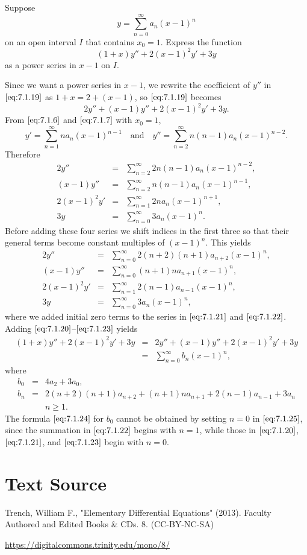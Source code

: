 \documentclass{ximera}
\begin{document}
\begin{example}\label{example:7.1.7}
Suppose
$$
y=\sum_{n=0}^\infty a_n (x-1)^n
$$
 on an open interval $I$ that contains $x_0=1$.
Express the function
\begin{equation} \label{eq:7.1.19}
(1+x)y''+2(x-1)^2y'+3y
\end{equation}
as a power series in $x-1$ on $I$.

\begin{explanation}  Since we want a  power series in $x-1$,
we rewrite the coefficient of $y''$ in $\eqref{eq:7.1.19}$ as
$1+x=2+(x-1)$, so   $\eqref{eq:7.1.19}$ becomes
$$
2y''+(x-1)y''+2(x-1)^2y'+3y.
$$
From $\eqref{eq:7.1.6}$ and $\eqref{eq:7.1.7}$ with $x_0=1$,
$$
y'=\sum_{n=1}^\infty na_n(x-1)^{n-1}\quad\mbox{and}\quad
y ''=\sum_{n=2}^\infty n(n-1)a_n(x-1)^{n-2}.
$$
Therefore
\begin{eqnarray*}
2y ''&=&\sum_{n=2}^\infty 2n(n-1)a_n(x-1)^{n-2},\\
(x-1)y ''&=&\sum_{n=2}^\infty n(n-1)a_n(x-1)^{n-1},\\
2(x-1)^2y'&=&\sum_{n=1}^\infty2na_n(x-1)^{n+1},\\
3y&=&\sum_{n=0}^\infty 3a_n (x-1)^n.
\end{eqnarray*}
Before adding these four series we shift indices in the first three so
that their general terms become constant multiples of $(x-1)^n$. This
yields
\begin{eqnarray}
2y ''&=&\sum_{n=0}^\infty 2(n+2)(n+1)a_{n+2}(x-1)^n,\label{eq:7.1.20}\\
(x-1)y''&=&\sum_{n=0}^\infty (n+1)na_{n+1}(x-1)^n,
\label{eq:7.1.21}\\
2(x-1)^2y'&=&\sum_{n=1}^\infty 2(n-1)a_{n-1}(x-1)^n,\label{eq:7.1.22}\\
3y&=&\sum_{n=0}^\infty 3a_n (x-1)^n, \label{eq:7.1.23}
\end{eqnarray}
where we added initial zero terms to the series in $\eqref{eq:7.1.21}$
and $\eqref{eq:7.1.22}$.  Adding $\eqref{eq:7.1.20}$--$\eqref{eq:7.1.23}$ yields
\begin{eqnarray*}
(1+x)y''+2(x-1)^2y'+3y&=&2y''+(x-1)y''+2(x-1)^2y'+3y\\[5pt]
&=&\sum_{n=0}^\infty  b_n (x-1)^n,
\end{eqnarray*}
where
\begin{eqnarray}
b_0&=&4a_2+3a_0, \label{eq:7.1.24}\\
b_n&=&2(n+2)(n+1)a_{n+2}+(n+1)na_{n+1}+2(n-1)a_{n-1}+3a_n\nonumber
\\
&&n\geq 1\label{eq:7.1.25}.
\end{eqnarray}
The formula $\eqref{eq:7.1.24}$ for $b_0$ cannot be obtained by
setting $n=0$ in $\eqref{eq:7.1.25}$, since the summation in $\eqref{eq:7.1.22}$
begins with $n=1$,  while those in $\eqref{eq:7.1.20}$, $\eqref{eq:7.1.21}$,
and $\eqref{eq:7.1.23}$ begin with $n=0$.
\end{explanation}
\end{example}



\section*{Text Source}
Trench, William F., "Elementary Differential Equations" (2013). Faculty Authored and Edited Books \& CDs. 8. (CC-BY-NC-SA)

\href{https://digitalcommons.trinity.edu/mono/8/}{https://digitalcommons.trinity.edu/mono/8/}
\end{document}
